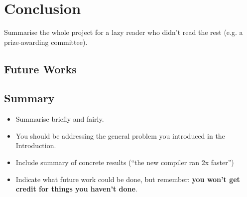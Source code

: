 \chapter{Conclusion}    
Summarise the whole project for a lazy reader who didn't read the rest (e.g. a prize-awarding committee).
\section{Future Works}

\section{Summary}
\begin{itemize}
    \item
        Summarise briefly and fairly.
    \item
        You should be addressing the general problem you introduced in the
        Introduction.        
    \item
        Include summary of concrete results (``the new compiler ran 2x
        faster'')
    \item
        Indicate what future work could be done, but remember: \textbf{you
        won't get credit for things you haven't done}.
\end{itemize}